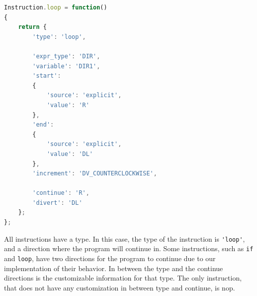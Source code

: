 \begin{lstlisting}[language=javascript]
Instruction.loop = function()
{
	return {
		'type': 'loop',

		'expr_type': 'DIR',
		'variable': 'DIR1',
		'start':
		{
			'source': 'explicit',
			'value': 'R'
		},
		'end':
		{
			'source': 'explicit',
			'value': 'DL'
		},
		'increment': 'DV_COUNTERCLOCKWISE',
		
		'continue': 'R',
		'divert': 'DL'
	};
};
\end{lstlisting}

All instructions have a type.
In this case, the type of the instruction is \verb|'loop'|, and a direction where the program will continue in.
Some instructions, such as \verb|if| and \verb|loop|, have two directions for the program to continue due to our implementation of their behavior.
In between the type and the continue directions is the customizable information for that type.
The only instruction, that does not have any customization in between type and continue, is nop.
